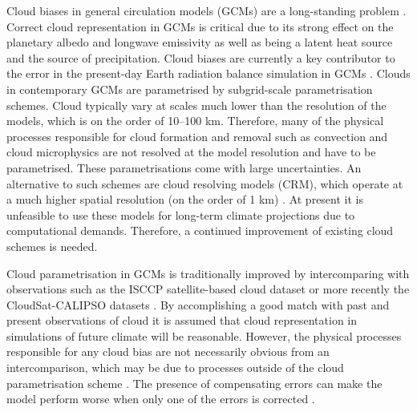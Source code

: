 Cloud biases in general circulation models (GCMs) are a long-standing problem
\citep{vignesh2020}. Correct cloud representation in GCMs is critical due
to its strong effect on the planetary albedo and longwave emissivity as well as
being a latent heat source and the source of precipitation. Cloud biases are
currently a key contributor to the error in the present-day Earth
radiation balance simulation in GCMs \citep{li2013}. Clouds in contemporary
GCMs are parametrised by subgrid-scale parametrisation schemes. Cloud typically vary at scales much lower
than the resolution of the models, which is on the order of 10--100 km. Therefore, many of the physical
processes responsible for cloud formation and removal such as convection and cloud microphysics are not resolved at the
model resolution and have to be parametrised. These parametrisations come with
large uncertainties. An alternative to such schemes are cloud resolving models
(CRM), which operate at a much higher spatial resolution (on the order of 1 km)
\citep{guichard2017,satoh2019}.
At present it is unfeasible to use these models for long-term climate
projections due to computational demands. Therefore, a continued improvement of
existing cloud schemes is needed.

Cloud parametrisation in GCMs is traditionally improved by intercomparing with
observations such as the ISCCP satellite-based cloud dataset \citep{rossow1991}
or more recently the CloudSat-CALIPSO datasets
\citep{stephens2002,winker2003}. By accomplishing a good match with past and
present observations of cloud it is assumed that cloud representation in
simulations of future climate will be reasonable. However, the physical
processes responsible for any cloud bias are not necessarily obvious from an
intercomparison, which may be due to processes outside of the cloud
parametrisation scheme \citep{morcrette2010}. The presence of compensating
errors can make the model perform worse when only one of the errors is
corrected \citep{hourdin2017}.

